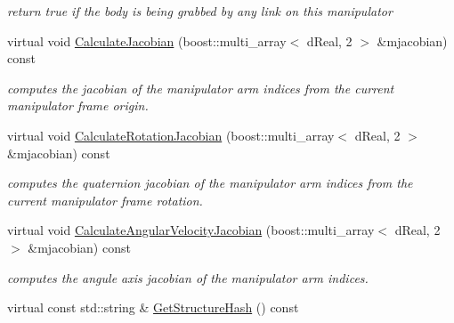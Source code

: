 \begin{DoxyCompactItemize}
\begin{DoxyCompactList}\small\item\em return true if the body is being grabbed by any link on this manipulator \item\end{DoxyCompactList}\item 
\hypertarget{classOpenRAVE_1_1RobotBase_1_1Manipulator_aa52f91874dcc3f6a9525294c819b5634}{
virtual void \hyperlink{classOpenRAVE_1_1RobotBase_1_1Manipulator_aa52f91874dcc3f6a9525294c819b5634}{CalculateJacobian} (boost::multi\_\-array$<$ dReal, 2 $>$ \&mjacobian) const }
\label{classOpenRAVE_1_1RobotBase_1_1Manipulator_aa52f91874dcc3f6a9525294c819b5634}

\begin{DoxyCompactList}\small\item\em computes the jacobian of the manipulator arm indices from the current manipulator frame origin. \item\end{DoxyCompactList}\item 
\hypertarget{classOpenRAVE_1_1RobotBase_1_1Manipulator_a20e08189ce7cdd52494706e4221481ec}{
virtual void \hyperlink{classOpenRAVE_1_1RobotBase_1_1Manipulator_a20e08189ce7cdd52494706e4221481ec}{CalculateRotationJacobian} (boost::multi\_\-array$<$ dReal, 2 $>$ \&mjacobian) const }
\label{classOpenRAVE_1_1RobotBase_1_1Manipulator_a20e08189ce7cdd52494706e4221481ec}

\begin{DoxyCompactList}\small\item\em computes the quaternion jacobian of the manipulator arm indices from the current manipulator frame rotation. \item\end{DoxyCompactList}\item 
\hypertarget{classOpenRAVE_1_1RobotBase_1_1Manipulator_a47689e0294c39e5accb1c634a5b0296c}{
virtual void \hyperlink{classOpenRAVE_1_1RobotBase_1_1Manipulator_a47689e0294c39e5accb1c634a5b0296c}{CalculateAngularVelocityJacobian} (boost::multi\_\-array$<$ dReal, 2 $>$ \&mjacobian) const }
\label{classOpenRAVE_1_1RobotBase_1_1Manipulator_a47689e0294c39e5accb1c634a5b0296c}

\begin{DoxyCompactList}\small\item\em computes the angule axis jacobian of the manipulator arm indices. \item\end{DoxyCompactList}\item 
\hypertarget{classOpenRAVE_1_1RobotBase_1_1Manipulator_ae230a8d361998e79a15128bfe18ec86a}{
virtual const std::string \& \hyperlink{classOpenRAVE_1_1RobotBase_1_1Manipulator_ae230a8d361998e79a15128bfe18ec86a}{GetStructureHash} () const }
\label{classOpenRAVE_1_1RobotBase_1_1Manipulator_ae230a8d361998e79a15128bfe18ec86a}


\end{DoxyCompactItemize}
